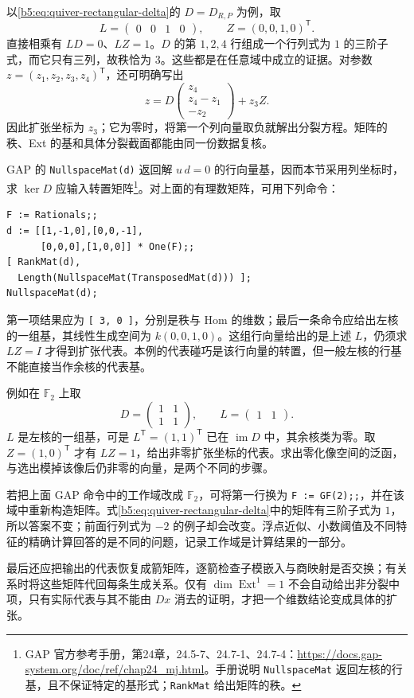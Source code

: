\ProseParagraphBreak
以\eqref{b5:eq:quiver-rectangular-delta}的 \(D=D_{R,P}\) 为例，取
\[
	L=\begin{pmatrix}0&0&1&0\end{pmatrix},\qquad
	Z=(0,0,1,0)^{\mathsf T}.
\]
直接相乘有 \(LD=0\)、\(LZ=1\)。\(D\) 的第 \(1,2,4\) 行组成一个行列式为 \(1\) 的三阶子式，而它只有三列，故秩恰为 \(3\)。这些都是在任意域中成立的证据。对参数 \(z=(z_1,z_2,z_3,z_4)^{\mathsf T}\)，还可明确写出
\[
	z=D\begin{pmatrix}z_4\\z_4-z_1\\-z_2\end{pmatrix}
	+z_3Z.
\]
因此扩张坐标为 \(z_3\)；它为零时，将第一个列向量取负就解出分裂方程。矩阵的秩、Ext 的基和具体分裂截面都能由同一份数据复核。

\ProseParagraphBreak
GAP 的 \texttt{NullspaceMat(d)} 返回解 \(u\,d=0\) 的行向量基，因而本节采用列坐标时，求 \(\ker D\) 应输入转置矩阵\footnote{GAP 官方参考手册，第24章，24.5-7、24.7-1、24.7-4：\url{https://docs.gap-system.org/doc/ref/chap24_mj.html}。手册说明 \texttt{NullspaceMat} 返回左核的行基，且不保证特定的基形式；\texttt{RankMat} 给出矩阵的秩。}。对上面的有理数矩阵，可用下列命令：
\begin{verbatim}
F := Rationals;;
d := [[1,-1,0],[0,0,-1],
      [0,0,0],[1,0,0]] * One(F);;
[ RankMat(d),
  Length(NullspaceMat(TransposedMat(d))) ];
NullspaceMat(d);
\end{verbatim}
第一项结果应为 \texttt{[ 3, 0 ]}，分别是秩与 Hom 的维数；最后一条命令应给出左核的一组基，其线性生成空间为 \(k(0,0,1,0)\)。这组行向量给出的是上述 \(L\)，仍须求 \(LZ=I\) 才得到扩张代表。本例的代表碰巧是该行向量的转置，但一般左核的行基不能直接当作余核的代表基。

\ProseParagraphBreak
例如在 \(\mathbb F_2\) 上取
\[
	D=\begin{pmatrix}1&1\\1&1\end{pmatrix},\qquad L=\begin{pmatrix}1&1\end{pmatrix}.
\]
\(L\) 是左核的一组基，可是 \(L^{\mathsf T}=(1,1)^{\mathsf T}\) 已在 \(\operatorname{im}D\) 中，其余核类为零。取 \(Z=(1,0)^{\mathsf T}\) 才有 \(LZ=1\)，给出非零扩张坐标的代表。求出零化像空间的泛函，与选出模掉该像后仍非零的向量，是两个不同的步骤。

\ProseParagraphBreak
若把上面 GAP 命令中的工作域改成 \(\mathbb F_2\)，可将第一行换为 \texttt{F := GF(2);;}，并在该域中重新构造矩阵。式\eqref{b5:eq:quiver-rectangular-delta}中的矩阵有三阶子式为 \(1\)，所以答案不变；前面行列式为 \(-2\) 的例子却会改变。浮点近似、小数阈值及不同特征的精确计算回答的是不同的问题，记录工作域是计算结果的一部分。

\ProseParagraphBreak
最后还应把输出的代表恢复成箭矩阵，逐箭检查子模嵌入与商映射是否交换；有关系时将这些矩阵代回每条生成关系。仅有 \(\dim\operatorname{Ext}^1=1\) 不会自动给出非分裂中项，只有实际代表与其不能由 \(Dx\) 消去的证明，才把一个维数结论变成具体的扩张。
